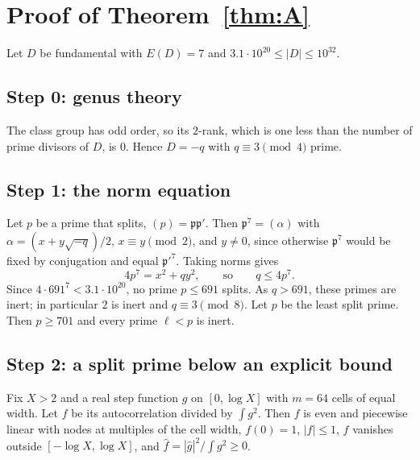 \documentclass[11pt]{amsart}
\theoremstyle{remark}
\newcommand{\p}{\mathfrak{p}}
\begin{document}
\section{Proof of Theorem~\ref{thm:A}}

Let $D$ be fundamental with $E(D)=7$ and $3.1\cdot10^{20}\le|D|\le10^{32}$.

\subsection*{Step 0: genus theory}
The class group has odd order, so its $2$-rank, which is one less than the number of prime divisors of $D$, is $0$. Hence $D=-q$ with $q\equiv3\pmod4$ prime.

\subsection*{Step 1: the norm equation}
Let $p$ be a prime that splits, $(p)=\p\p'$. Then $\p^7=(\alpha)$ with $\alpha=(x+y\sqrt{-q})/2$, $x\equiv y\pmod 2$, and $y\ne0$, since otherwise $\p^7$ would be fixed by conjugation and equal $\p'^7$. Taking norms gives
\[
4p^7=x^2+qy^2,\qquad\text{so}\qquad q\le4p^7.
\]
Since $4\cdot691^7<3.1\cdot10^{20}$, no prime $p\le691$ splits. As $q>691$, these primes are inert; in particular $2$ is inert and $q\equiv3\pmod8$. Let $p$ be the least split prime. Then $p\ge701$ and every prime $\ell<p$ is inert.

\subsection*{Step 2: a split prime below an explicit bound}
Fix $X>2$ and a real step function $g$ on $[0,\log X]$ with $m=64$ cells of equal width. Let $f$ be its autocorrelation divided by $\int g^2$. Then $f$ is even and piecewise linear with nodes at multiples of the cell width, $f(0)=1$, $|f|\le1$, $f$ vanishes outside $[-\log X,\log X]$, and $\hat f=|\hat g|^2/\!\int g^2\ge0$.
\end{document}
